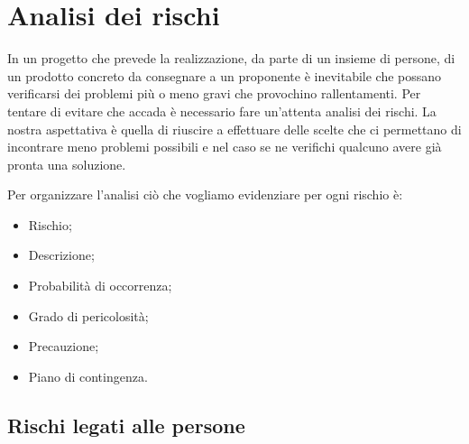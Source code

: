 \chapter{Analisi dei rischi}

In un progetto che prevede la realizzazione, da parte di un insieme di persone, di un prodotto concreto 
da consegnare a un proponente è inevitabile che possano verificarsi dei problemi più o meno gravi che
provochino rallentamenti. Per tentare di evitare che accada è necessario fare un'attenta analisi dei
rischi. La nostra aspettativa è quella di riuscire a effettuare delle scelte che ci permettano di
incontrare meno problemi possibili e nel caso se ne verifichi qualcuno avere già pronta una soluzione.

Per organizzare l'analisi ciò che vogliamo evidenziare per ogni rischio è:
\begin{itemize}
    \item Rischio;
    \item Descrizione;
    \item Probabilità di occorrenza;
    \item Grado di pericolosità;
    \item Precauzione;
    \item Piano di contingenza.
\end{itemize}

\newpage
\section{Rischi legati alle persone}


